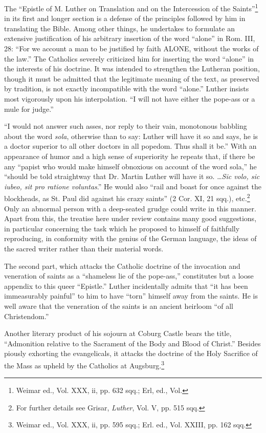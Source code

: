 The “Epistle of M. Luther on Translation and on the Intercession
of the Saints”\footnote{Weimar ed., Vol. XXX, ii, pp. 632 sqq.; Erl, ed., Vol.}
in its first and longer section is a defense of the principles
followed by him in translating the Bible. Among other things,
he undertakes to formulate an extensive justification of his arbitrary
insertion of the word “alone” in Rom. III, 28: “For we account a
man to be justified by faith ALONE, without the works of the law.”
The Catholics severely criticized him for inserting the word “alone”
in the interests of his doctrine. It was intended to strengthen the Lutheran
position, though it must be admitted that the legitimate meaning
of the text, as preserved by tradition, is not exactly incompatible
with the word “alone.” Luther insists most vigorously upon his interpolation.
“I will not have either the pope-ass or a mule for judge.”

“I would not answer such asses, nor reply to their vain, monotonous
babbling about the word \textit{sola}, otherwise than to say: Luther will
have it so and says, he is a doctor superior to all other doctors in all
popedom. Thus shall it be.” With an appearance of humor and a
high sense of superiority he repeats that, if there be any “papist who
would make himself obnoxious on account of the word sola,” he
“should be told straightway that Dr. Martin Luther will have it so.
\dots \textit{Sic volo, sic iubeo, sit pro ratione voluntas}.” He would also “rail
and boast for once against the blockheads, as St. Paul did against his
crazy saints” (2 Cor. XI, 21 sqq.), etc.\footnote
{For further details see Grisar, \textit{Luther}, Vol. V, pp. 515 sqq.}
Only an abnormal person
with a deep-seated grudge could write in this manner. Apart from
this, the treatise here under review contains many good suggestions, in
particular concerning the task which he proposed to himself of faithfully
reproducing, in conformity with the genius of the German
language, the ideas of the sacred writer rather than their material
words.

The second part, which attacks the Catholic doctrine of the invocation
and veneration of saints as a “shameless lie of the pope-ass,”
constitutes but a loose appendix to this queer “Epistle.” Luther incidentally
admits that “it has been immeasurably painful” to him to
have “torn” himself away from the saints. He is well aware that the
veneration of the saints is an ancient heirloom “of all Christendom.”

Another literary product of his sojourn at Coburg Castle bears the
title, “Admonition relative to the Sacrament of the Body and Blood
of Christ.” Besides piously exhorting the evangelicals, it attacks the
doctrine of the Holy Sacrifice of the Mass as upheld by the Catholics
at Augsburg.\footnote{Weimar ed., Vol. XXX, ii, pp. 595 sqq.; Erl. ed., Vol. XXIII, pp. 162 sqq.}

